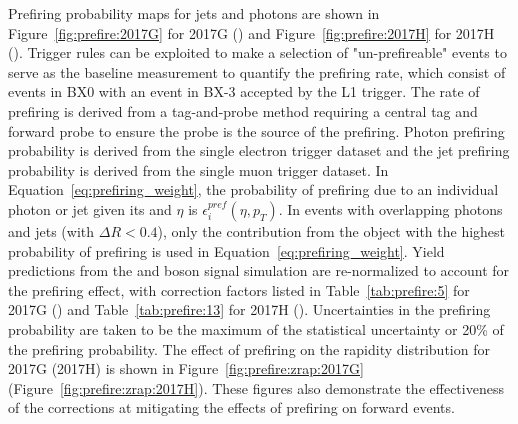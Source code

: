 Prefiring probability maps for jets and photons are shown in Figure~\ref{fig:prefire:2017G} for 2017G (\sg) and Figure~\ref{fig:prefire:2017H} for 2017H (\sh). Trigger rules can be exploited to make a selection of "un-prefireable" events to serve as the baseline measurement to quantify the prefiring rate, which consist of events in BX0 with an event in BX-3 accepted by the L1 trigger. The rate of prefiring is derived from a tag-and-probe method requiring a central tag and forward probe to ensure the probe is the source of the prefiring.  Photon prefiring probability is derived from the single electron trigger dataset and the jet prefiring probability is derived from the single muon trigger dataset. In Equation~\ref{eq:prefiring_weight}, the probability of prefiring due to an individual photon or jet given its \pt and $\eta$ is $\epsilon_i^{pref}(\eta,p_T)$. In events with overlapping photons and jets (with $\Delta  R < 0.4$), only the contribution from the object with the highest probability of prefiring is used in Equation~\ref{eq:prefiring_weight}\cite{LATHOMAS}. Yield predictions from the \Wpm and \Z boson signal simulation are re-normalized to account for the prefiring effect, with correction factors listed in Table~\ref{tab:prefire:5} for 2017G (\sg) and Table~\ref{tab:prefire:13} for 2017H (\sh). Uncertainties in the prefiring probability are taken to be the maximum of the statistical uncertainty or 20\% of the prefiring probability. The effect of prefiring on the \zee rapidity distribution for 2017G (2017H) is shown in  Figure~\ref{fig:prefire:zrap:2017G} (Figure~\ref{fig:prefire:zrap:2017H}). These figures also demonstrate the effectiveness of the corrections at mitigating the effects of prefiring on forward events.


